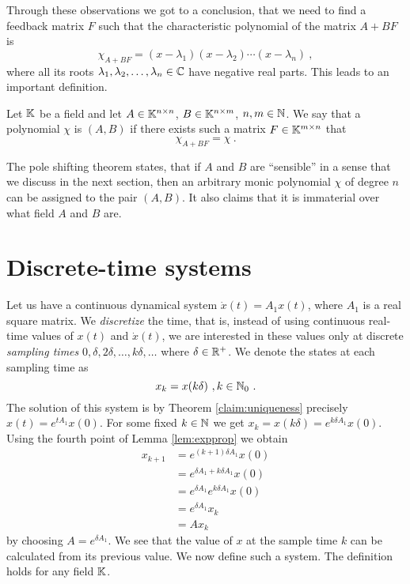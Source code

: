 Through these observations we got to a conclusion, that we need to find a feedback matrix $F$ such that the characteristic polynomial of the matrix $A+BF$ is $$\chi_{A+BF}=(x-\lambda_1)(x-\lambda_2)\cdots(x-\lambda_n)\ ,$$ where all its roots $\lambda_1,\lambda_2,\ldots,\lambda_n \in \mathbb{C}$ have negative real parts. This leads to an important definition.

\begin{definition}
    Let $\mathbb{K}$ be a field and let $A \in \mathbb{K}^{n \times n}$, $B \in \mathbb{K}^{n \times m}$, $n,m \in \mathbb{N}$. We say that a polynomial $\chi$ is  $(A,B)$ if there exists such a matrix $F\in\mathbb{K}^{m \times n}$ that $$\chi_{A+BF}=\chi\ .$$
\end{definition}

The pole shifting theorem states, that if $A$ and $B$ are ``sensible'' in a sense that we discuss in the next section, then an arbitrary monic polynomial $\chi$ of degree $n$ can be assigned to the pair $(A,B)$. It also claims that it is immaterial over what field $A$ and $B$ are.

\section{Discrete-time systems}

Let us have a continuous dynamical system $\dot{x}(t)=A_1x(t)$, where $A_1$ is a real square matrix. We \textit{discretize} the time, that is, instead of using continuous real-time values of $x(t)$ and $\dot{x}(t)$, we are interested in these values only at discrete \textit{sampling times} $0,\delta,2\delta,\ldots,k\delta,\ldots$ where $\delta\in\mathbb{R}^+$. We denote the states at each sampling time as
$$x_k=x(k\delta)\ ,k\in\mathbb{N}_0\ .$$
The solution of this system is by Theorem \ref{claim:uniqueness} precisely $x(t)=e^{tA_1}x(0)$. For some fixed $k\in\mathbb{N}$ we get $x_k=x(k\delta)=e^{k\delta A_1}x(0)$. Using the fourth point of Lemma \ref{lem:expprop} we obtain 
\begin{align*}
	x_{k+1}
	&=e^{(k+1)\delta A_1}x(0) \\
	&=e^{\delta A_1 +k\delta A_1}x(0) \\
	&=e^{\delta A_1}e^{k\delta A_1}x(0) \\
	&=e^{\delta A_1}x_k \\
	&=Ax_k
\end{align*}
by choosing $A=e^{\delta A_1}$. We see that the value of $x$ at the sample time $k$ can be calculated from its previous value. We now define such a system. The definition holds for any field $\mathbb{K}$.

